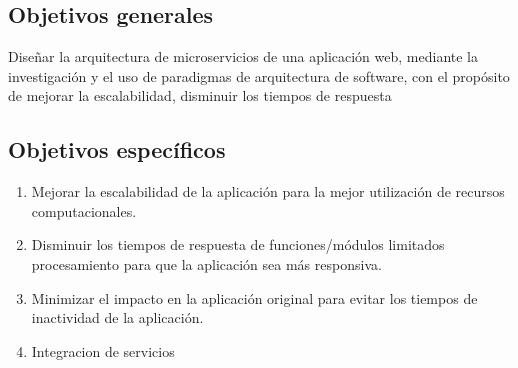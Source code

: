 
\subsection{Objetivos generales}
Diseñar la arquitectura de microservicios de una aplicación web,
mediante la investigación y el uso de paradigmas de arquitectura de software,
con el propósito de mejorar la escalabilidad, disminuir los tiempos de respuesta



\subsection{Objetivos específicos}

\begin{enumerate}
  \item Mejorar la escalabilidad de la aplicación para la mejor utilización de recursos computacionales.
  \item Disminuir los tiempos de respuesta de funciones/módulos limitados procesamiento para que la aplicación sea más responsiva.
  \item Minimizar el impacto en la aplicación original para evitar los tiempos de inactividad de la aplicación.
  \item Integracion de servicios
\end{enumerate}

